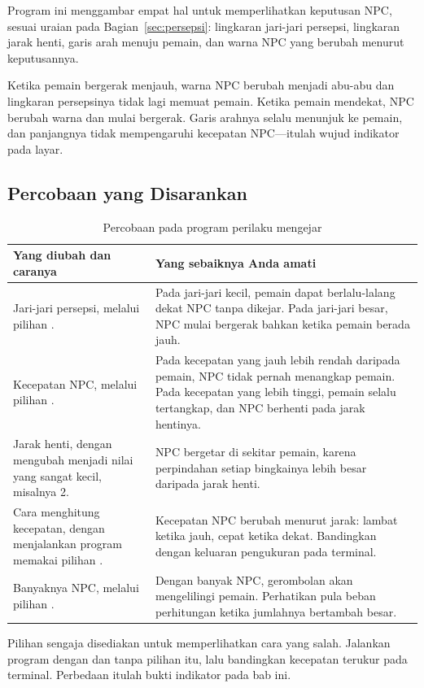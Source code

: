 Program ini menggambar empat hal untuk memperlihatkan keputusan NPC, sesuai
uraian pada Bagian~\ref{sec:persepsi}: lingkaran jari-jari persepsi, lingkaran
jarak henti, garis arah menuju pemain, dan warna NPC yang berubah menurut
keputusannya.

Ketika pemain bergerak menjauh, warna NPC berubah menjadi abu-abu dan lingkaran
persepsinya tidak lagi memuat pemain. Ketika pemain mendekat, NPC berubah warna
dan mulai bergerak. Garis arahnya selalu menunjuk ke pemain, dan panjangnya
tidak mempengaruhi kecepatan NPC---itulah wujud indikator  pada layar.

\subsection{Percobaan yang Disarankan}

\begin{table}[htbp]
\centering
\caption{Percobaan pada program perilaku mengejar}
\label{tab:percobaan-ch08}
{\setlength{\tabcolsep}{4pt}\footnotesize%
\begin{tabularx}{\textwidth}{@{}L{5.6cm} Y@{}}
\toprule
\headrow \textbf{Yang diubah dan caranya} & \textbf{Yang sebaiknya Anda amati} \\
\midrule
Jari-jari persepsi, melalui pilihan . &
Pada jari-jari kecil, pemain dapat berlalu-lalang dekat NPC tanpa dikejar. Pada
jari-jari besar, NPC mulai bergerak bahkan ketika pemain berada jauh. \\
\addlinespace
Kecepatan NPC, melalui pilihan . &
Pada kecepatan yang jauh lebih rendah daripada pemain, NPC tidak pernah
menangkap pemain. Pada kecepatan yang lebih tinggi, pemain selalu tertangkap,
dan NPC berhenti pada jarak hentinya. \\
\addlinespace
Jarak henti, dengan mengubah  menjadi nilai yang sangat
kecil, misalnya 2. &
NPC bergetar di sekitar pemain, karena perpindahan setiap bingkainya lebih
besar daripada jarak henti. \\
\addlinespace
Cara menghitung kecepatan, dengan menjalankan program memakai pilihan
. &
Kecepatan NPC berubah menurut jarak: lambat ketika jauh, cepat ketika dekat.
Bandingkan dengan keluaran pengukuran pada terminal. \\
\addlinespace
Banyaknya NPC, melalui pilihan . &
Dengan banyak NPC, gerombolan akan mengelilingi pemain. Perhatikan pula beban
perhitungan ketika jumlahnya bertambah besar. \\
\bottomrule
\end{tabularx}}
\end{table}

\begin{catatabox}
Pilihan  sengaja disediakan untuk memperlihatkan cara yang salah.
Jalankan program dengan dan tanpa pilihan itu, lalu bandingkan kecepatan
terukur pada terminal. Perbedaan itulah bukti indikator  pada bab ini.
\end{catatabox}
